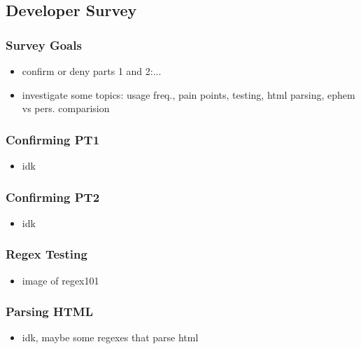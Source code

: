 \subsection{Developer Survey}

\begin{frame}
\frametitle{Survey Goals}
\begin{itemize}
\item confirm or deny parts 1 and 2:...
\item investigate some topics: usage freq., pain points, testing, html parsing, ephem vs pers. comparision
\end{itemize}
\end{frame}

\begin{frame}
\frametitle{Confirming PT1}
\begin{itemize}
\item idk
\end{itemize}
\end{frame}


\begin{frame}
\frametitle{Confirming PT2}
\begin{itemize}
\item idk
\end{itemize}
\end{frame}


\begin{frame}
\frametitle{Regex Testing}
\begin{itemize}
\item image of regex101
\end{itemize}
\end{frame}



\begin{frame}
\frametitle{Parsing HTML}
\begin{itemize}
\item idk, maybe some regexes that parse html
\end{itemize}
\end{frame}

